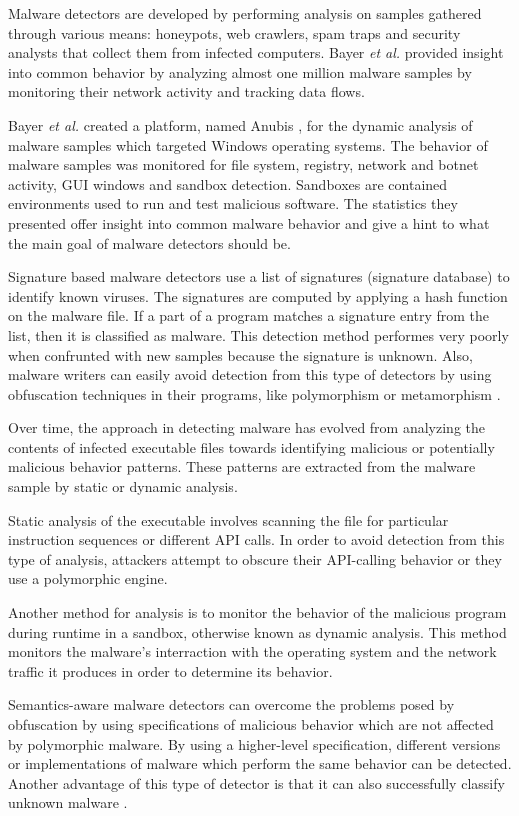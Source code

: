 Malware detectors are developed by performing analysis on samples gathered through various means: honeypots, web crawlers, spam traps and security analysts that collect them from infected computers. Bayer \textit{et al.} \cite{current-mal-behavior} provided insight into common behavior by analyzing almost one million malware samples by monitoring their network activity and tracking data flows.

Bayer \textit{et al.} created a platform, named Anubis \cite{anubis-platform}, for the dynamic analysis of malware samples which targeted Windows operating systems. The behavior of malware samples was monitored for file system, registry, network and botnet activity, GUI windows and sandbox detection. Sandboxes are contained environments used to run and test malicious software. The statistics they presented offer insight into common malware behavior and give a hint to what the main goal of malware detectors should be.

Signature based malware detectors use a list of signatures (signature database) to identify known viruses. The signatures are computed by applying a hash function on the malware file. If a part of a program matches a signature entry from the list, then it is classified as malware. This detection method performes very poorly when confrunted with new samples because the signature is unknown. Also, malware writers can easily avoid detection from this type of detectors by using obfuscation techniques in their programs, like polymorphism or metamorphism \cite{mining-specifications}. 

Over time, the approach in detecting malware has evolved from analyzing the contents of infected executable files towards identifying malicious or potentially malicious behavior patterns. These patterns are extracted from the malware sample by static or dynamic analysis.

Static analysis of the executable involves scanning the file for particular instruction sequences or different API calls. In order to avoid detection from this type of analysis, attackers attempt to obscure their API-calling behavior or they use a polymorphic engine.

Another method for analysis is to monitor the behavior of the malicious program during runtime in a sandbox, otherwise known as dynamic analysis. This method monitors the malware's interraction with the operating system and the network traffic it produces in order to determine its behavior.

Semantics-aware malware detectors can overcome the problems posed by obfuscation by using specifications of malicious behavior which are not affected by polymorphic malware. By using a higher-level specification, different versions or implementations of malware which perform the same behavior can be detected. Another advantage of this type of detector is that it can also successfully classify unknown malware \cite{semantics-based-detection}.

